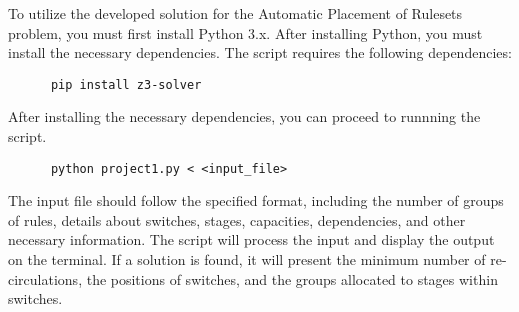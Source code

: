 To utilize the developed solution for the Automatic Placement of Rulesets problem, you must first install Python 3.x. After installing Python, you must install the necessary dependencies. The script requires the following dependencies:

\begin{verbatim}
      pip install z3-solver
\end{verbatim}

After installing the necessary dependencies, you can proceed to runnning the script.

\begin{verbatim}
      python project1.py < <input_file>
\end{verbatim}

The input file should follow the specified format, including the number of groups of rules, details about switches, stages, capacities, dependencies, and other necessary information. The script will process the input and display the output on the terminal. If a solution is found, it will present the minimum number of re-circulations, the positions of switches, and the groups allocated to stages within switches.